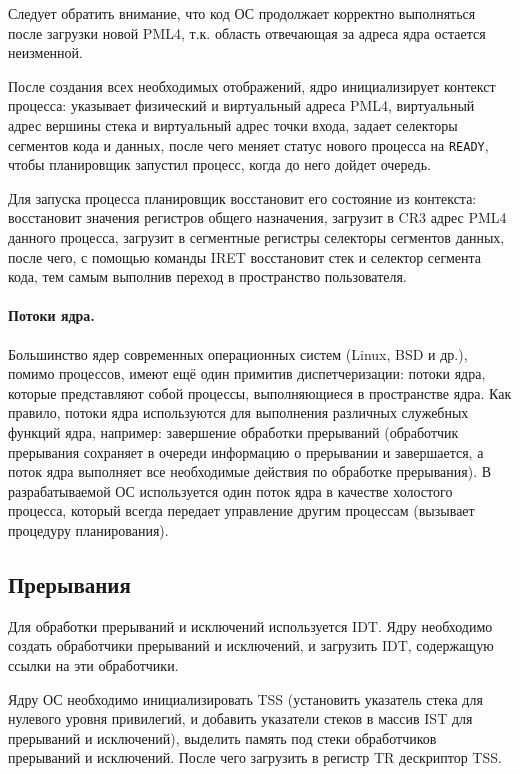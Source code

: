 Следует обратить внимание, что код ОС продолжает корректно выполняться после загрузки новой PML4,
т.к. область отвечающая за адреса ядра остается неизменной.

После создания всех необходимых отображений, ядро инициализирует контекст процесса: указывает
физический и виртуальный адреса PML4, виртуальный адрес вершины стека и виртуальный адрес
точки входа, задает селекторы сегментов кода и данных, после чего меняет статус нового процесса
на \texttt{READY}, чтобы планировщик запустил процесс, когда до него дойдет очередь.

Для запуска процесса планировщик восстановит его состояние из контекста: восстановит
значения регистров общего назначения, загрузит в CR3 адрес PML4 данного процесса, загрузит
в сегментные регистры селекторы сегментов данных, после чего, с помощью команды IRET восстановит
стек и селектор сегмента кода, тем самым выполнив переход в пространство пользователя.

\paragraph{Потоки ядра.} Большинство ядер современных операционных систем (Linux, BSD и др.),
помимо процессов, имеют ещё один примитив диспетчеризации: потоки ядра, которые представляют
собой процессы, выполняющиеся в пространстве ядра. Как правило, потоки ядра используются для
выполнения различных служебных функций ядра, например: завершение обработки прерываний (обработчик
прерывания сохраняет в очереди информацию о прерывании и завершается, а поток ядра выполняет все
необходимые действия по обработке прерывания). В разрабатываемой ОС используется один поток ядра в качестве
холостого процесса, который всегда передает управление другим процессам (вызывает
процедуру планирования).


\subsection{Прерывания}
Для обработки прерываний и исключений используется IDT. Ядру необходимо создать обработчики
прерываний и исключений, и загрузить IDT, содержащую ссылки на эти обработчики.

Ядру ОС необходимо инициализировать TSS (установить указатель стека для нулевого уровня привилегий,
и добавить указатели стеков в массив IST для прерываний и исключений), выделить память под стеки
обработчиков прерываний и исключений. После чего загрузить в регистр TR дескриптор TSS.


